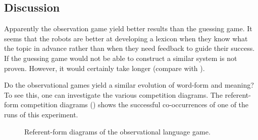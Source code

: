 \subsection{Discussion}

Apparently the observation game yield better results than the guessing game. It seems that the robots are better at developing a lexicon when they know what the topic in advance rather than when they need feedback to guide their success. If the guessing game would not be able to construct a similar system is not proven. However, it would certainly take longer (compare  with ).

Do the observational games yield a similar evolution of word-form and meaning? To see this, one can investigate the various competition diagrams. The ref\-erent-form competition diagrams () shows the successful co-occur\-rences of one of the runs of this experiment. 

\begin{figure}[t]
\centering
{}
\caption{Referent-form diagrams of the observational language game.}
\label{f:opt:rfoli}
\end{figure}

